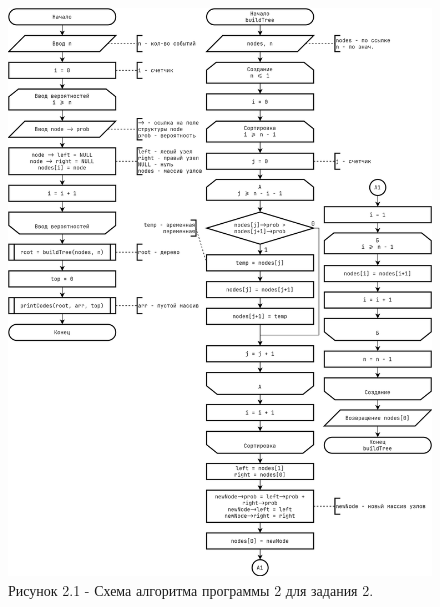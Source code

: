 \documentclass[oneside,a4paper,14pt]{extarticle}
\begin{document}
\begin{figure}[h!]
	\centering
	\includegraphics[height=0.9\textheight]{pics/flowchart_2_p1.png}
	\caption*{Рисунок 2.1 - Схема алгоритма программы 2 для задания 2.}
\end{figure}
\end{document}
